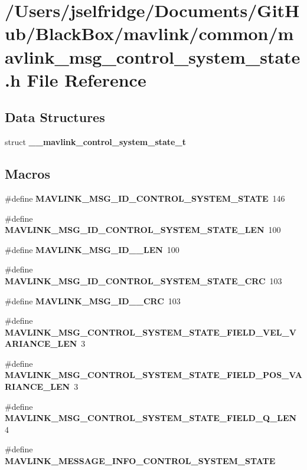 \section{/\+Users/jselfridge/\+Documents/\+Git\+Hub/\+Black\+Box/mavlink/common/mavlink\+\_\+msg\+\_\+control\+\_\+system\+\_\+state.h File Reference}
\label{mavlink__msg__control__system__state_8h}
\subsection*{Data Structures}
\begin{DoxyCompactItemize}
\item 
struct \textbf{ \+\_\+\+\_\+mavlink\+\_\+control\+\_\+system\+\_\+state\+\_\+t}
\end{DoxyCompactItemize}
\subsection*{Macros}
\begin{DoxyCompactItemize}
\item 
\#define \textbf{ M\+A\+V\+L\+I\+N\+K\+\_\+\+M\+S\+G\+\_\+\+I\+D\+\_\+\+C\+O\+N\+T\+R\+O\+L\+\_\+\+S\+Y\+S\+T\+E\+M\+\_\+\+S\+T\+A\+TE}~146
\item 
\#define \textbf{ M\+A\+V\+L\+I\+N\+K\+\_\+\+M\+S\+G\+\_\+\+I\+D\+\_\+\+C\+O\+N\+T\+R\+O\+L\+\_\+\+S\+Y\+S\+T\+E\+M\+\_\+\+S\+T\+A\+T\+E\+\_\+\+L\+EN}~100
\item 
\#define \textbf{ M\+A\+V\+L\+I\+N\+K\+\_\+\+M\+S\+G\+\_\+\+I\+D\+\_\+\_\+\+L\+EN}~100
\item 
\#define \textbf{ M\+A\+V\+L\+I\+N\+K\+\_\+\+M\+S\+G\+\_\+\+I\+D\+\_\+\+C\+O\+N\+T\+R\+O\+L\+\_\+\+S\+Y\+S\+T\+E\+M\+\_\+\+S\+T\+A\+T\+E\+\_\+\+C\+RC}~103
\item 
\#define \textbf{ M\+A\+V\+L\+I\+N\+K\+\_\+\+M\+S\+G\+\_\+\+I\+D\+\_\+\_\+\+C\+RC}~103
\item 
\#define \textbf{ M\+A\+V\+L\+I\+N\+K\+\_\+\+M\+S\+G\+\_\+\+C\+O\+N\+T\+R\+O\+L\+\_\+\+S\+Y\+S\+T\+E\+M\+\_\+\+S\+T\+A\+T\+E\+\_\+\+F\+I\+E\+L\+D\+\_\+\+V\+E\+L\+\_\+\+V\+A\+R\+I\+A\+N\+C\+E\+\_\+\+L\+EN}~3
\item 
\#define \textbf{ M\+A\+V\+L\+I\+N\+K\+\_\+\+M\+S\+G\+\_\+\+C\+O\+N\+T\+R\+O\+L\+\_\+\+S\+Y\+S\+T\+E\+M\+\_\+\+S\+T\+A\+T\+E\+\_\+\+F\+I\+E\+L\+D\+\_\+\+P\+O\+S\+\_\+\+V\+A\+R\+I\+A\+N\+C\+E\+\_\+\+L\+EN}~3
\item 
\#define \textbf{ M\+A\+V\+L\+I\+N\+K\+\_\+\+M\+S\+G\+\_\+\+C\+O\+N\+T\+R\+O\+L\+\_\+\+S\+Y\+S\+T\+E\+M\+\_\+\+S\+T\+A\+T\+E\+\_\+\+F\+I\+E\+L\+D\+\_\+\+Q\+\_\+\+L\+EN}~4
\item 
\#define \textbf{ M\+A\+V\+L\+I\+N\+K\+\_\+\+M\+E\+S\+S\+A\+G\+E\+\_\+\+I\+N\+F\+O\+\_\+\+C\+O\+N\+T\+R\+O\+L\+\_\+\+S\+Y\+S\+T\+E\+M\+\_\+\+S\+T\+A\+TE}
\end{DoxyCompactItemize}
